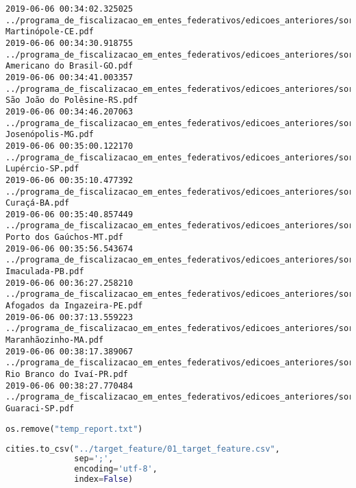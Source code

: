\begin{lstlisting}
2019-06-06 00:34:02.325025 ../programa_de_fiscalizacao_em_entes_federativos/edicoes_anteriores/sorteio_40/3407-Martinópole-CE.pdf
2019-06-06 00:34:30.918755 ../programa_de_fiscalizacao_em_entes_federativos/edicoes_anteriores/sorteio_40/3431-Americano do Brasil-GO.pdf
2019-06-06 00:34:41.003357 ../programa_de_fiscalizacao_em_entes_federativos/edicoes_anteriores/sorteio_40/3342-São João do Polêsine-RS.pdf
2019-06-06 00:34:46.207063 ../programa_de_fiscalizacao_em_entes_federativos/edicoes_anteriores/sorteio_40/3360-Josenópolis-MG.pdf
2019-06-06 00:35:00.122170 ../programa_de_fiscalizacao_em_entes_federativos/edicoes_anteriores/sorteio_40/3352-Lupércio-SP.pdf
2019-06-06 00:35:10.477392 ../programa_de_fiscalizacao_em_entes_federativos/edicoes_anteriores/sorteio_40/3330-Curaçá-BA.pdf
2019-06-06 00:35:40.857449 ../programa_de_fiscalizacao_em_entes_federativos/edicoes_anteriores/sorteio_40/3394-Porto dos Gaúchos-MT.pdf
2019-06-06 00:35:56.543674 ../programa_de_fiscalizacao_em_entes_federativos/edicoes_anteriores/sorteio_40/3421-Imaculada-PB.pdf
2019-06-06 00:36:27.258210 ../programa_de_fiscalizacao_em_entes_federativos/edicoes_anteriores/sorteio_40/3411-Afogados da Ingazeira-PE.pdf
2019-06-06 00:37:13.559223 ../programa_de_fiscalizacao_em_entes_federativos/edicoes_anteriores/sorteio_40/3419-Maranhãozinho-MA.pdf
2019-06-06 00:38:17.389067 ../programa_de_fiscalizacao_em_entes_federativos/edicoes_anteriores/sorteio_40/3320-Rio Branco do Ivaí-PR.pdf
2019-06-06 00:38:27.770484 ../programa_de_fiscalizacao_em_entes_federativos/edicoes_anteriores/sorteio_40/3348-Guaraci-SP.pdf
\end{lstlisting}

\begin{lstlisting}[language=Python]
os.remove("temp_report.txt")
\end{lstlisting}

\begin{lstlisting}[language=Python]
cities.to_csv("../target_feature/01_target_feature.csv",
              sep=';',
              encoding='utf-8',
              index=False)
\end{lstlisting}

